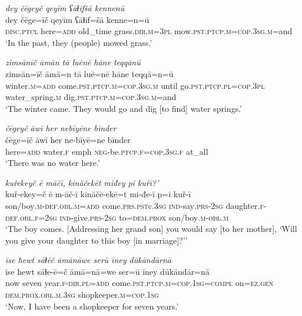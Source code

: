 \ea \label{ŽE.1}
\textit{dey čēgeyč qeyīm ʕāɫifšā kennenū} \\ 
\gll dey čēge=īč qeyīm ʕāɫif=šā kenne=n=ū \\ 
 \textsc{disc.ptcl} here\textsc{=add} old\_time grass\textsc{.dir}\textsc{.m}\textsc{=3pl} mow\textsc{.pst}\textsc{.ptcp}\textsc{.m}\textsc{=cop}\textsc{.3sg}\textsc{.m}=and \\ 
\glt `In the past, they (people) mowed grass.'
\z 
 
\ea \label{ŽE.15}
\textit{zimsānīč āmān tā luēnē hāne teqqānū} \\ 
\gll zimsān=īč āmā=n tā luē=nē hāne teqqā=n=ū \\ 
 winter\textsc{.m}\textsc{=add} come\textsc{.pst}\textsc{.ptcp}\textsc{.m}\textsc{=cop}\textsc{.3sg}\textsc{.m} until go\textsc{.pst}\textsc{.ptcp}\textsc{.pl}\textsc{=cop}\textsc{.3pl} water\_spring\textsc{.m} dig\textsc{.pst}\textsc{.ptcp}\textsc{.m}\textsc{=cop}\textsc{.3sg}\textsc{.m}=and \\ 
\glt `The winter came. They would go and dig [to find] water springs.'
\z 
 
\ea \label{ŽE.23}
\textit{čēgeyč āwī her nebīyēne bīnder} \\ 
\gll čēge=īč āwī her ne-bīyē=ne bīnder \\ 
 here\textsc{=add} water\textsc{.f} emph \textsc{neg-}be\textsc{.ptcp}\textsc{.f}\textsc{=cop}\textsc{.3sg}\textsc{.f} at\_all \\ 
\glt `There was no water here.'
\z 
 
\ea \label{ŽE.75}
\textit{kuřekeyč ē māčī, kināčekēt miđey pī kuřī?’} \\ 
\gll kuř-ekey=č ē m-āč-ī kināčē-ekē=t mi-đe-ī p=ī kuř-ī \\ 
 son/boy\textsc{.m}\textsc{-def}\textsc{.obl}\textsc{.m}\textsc{=add} come\textsc{.prs}\textsc{.pst}c\textsc{.3sg} \textsc{ind-}say\textsc{.prs}-\textsc{2sg} daughter\textsc{.f}\textsc{-def}\textsc{.obl}\textsc{.f}\textsc{=\textsc{2sg}} \textsc{ind-}give\textsc{.prs}-\textsc{2sg} to=\textsc{dem.prox} son/boy\textsc{.m}\textsc{-obl}\textsc{.m} \\ 
\glt `The boy comes. [Addressing her grand son] you would say [to her mother], ‘Will you give your daughter to this boy [in marriage]?’'
\z 
 
\ea \label{ŽM.8}
\textit{īse ħewt sāɫēč āmānāwe serū īney dūkāndārnā} \\ 
\gll īse ħewt sāɫe-ē=č āmā=nā=we ser=ū īney dūkāndār=nā \\ 
 now seven year\textsc{.f}\textsc{-dir}\textsc{.pl}\textsc{=add} come\textsc{.pst}\textsc{.ptcp}\textsc{.m}\textsc{=cop}\textsc{.\textsc{1sg}}\textsc{=compl} on\textsc{=ez.gen} \textsc{dem.prox}\textsc{.obl}\textsc{.m}\textsc{.3sg} shopkeeper\textsc{.m}\textsc{=cop}\textsc{.\textsc{1sg}} \\ 
\glt `Now, I have been a shopkeeper for seven years.'
\z 
 
